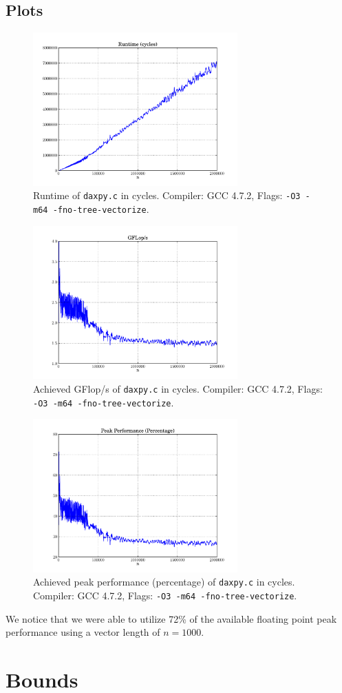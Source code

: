 \documentclass[portrait,a4paper]{article}
\begin{document}
\subsection{Plots}
\begin{figure}[H]
\centering
\includegraphics[width=0.7\textwidth]{daxpy/Runtimecycles.pdf}
\caption{Runtime of \lstinline{daxpy.c} in cycles. Compiler: GCC 4.7.2, Flags: \lstinline{-O3 -m64 -fno-tree-vectorize}.}
\end{figure}

\begin{figure}[H]
\centering
\includegraphics[width=0.7\textwidth]{daxpy/GFlops.pdf}
\caption{Achieved GFlop/s of \lstinline{daxpy.c} in cycles. Compiler: GCC 4.7.2, Flags: \lstinline{-O3 -m64 -fno-tree-vectorize}.}
\end{figure}

\begin{figure}[H]
\centering
\includegraphics[width=0.7\textwidth]{daxpy/PeakPerformancePercentage.pdf}
\caption{Achieved peak performance (percentage) of \lstinline{daxpy.c} in cycles. Compiler: GCC 4.7.2, Flags: \lstinline{-O3 -m64 -fno-tree-vectorize}.}
\end{figure}

We notice that we were able to utilize 72\% of the available floating point peak performance using a vector length of $n=1000$.

\section{Bounds}
\end{document}

